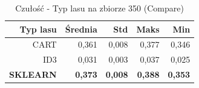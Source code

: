 \begin{table}[htbp]
\centering
\small
\setlength{\tabcolsep}{6pt}
\renewcommand{\arraystretch}{1.2}
\caption{Czułość - Typ lasu na zbiorze 350 (Compare)}
\label{tab:Compare_on_350_recall}
\begin{tabular}{r|r|r|r|r}
\toprule
Typ lasu & Średnia & Std & Maks & Min \\
\hline
CART & 0,361 & 0,008 & 0,377 & 0,346 \\
ID3 & 0,031 & 0,003 & 0,037 & 0,025 \\
\textbf{SKLEARN} & \textbf{0,373} & \textbf{0,008} & \textbf{0,388} & \textbf{0,353} \\
\bottomrule
\end{tabular}
\end{table}